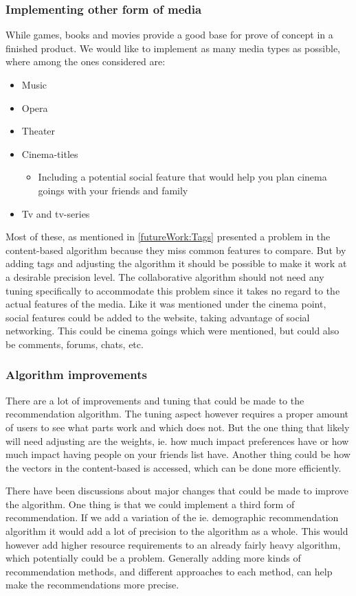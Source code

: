 \subsubsection{Implementing other form of media}
While games, books and movies provide a good base for prove of concept in a finished product. We would like to implement as many media types as possible, where among the ones considered are:
\begin{itemize}
\item Music
\item Opera
\item Theater
\item Cinema-titles
\begin{itemize}
\item Including a potential social feature that would help you plan cinema goings with your friends and family
\end{itemize}
\item Tv and tv-series
\end{itemize}
Most of these, as mentioned in \ref{futureWork:Tags} presented a problem in the content-based algorithm because they miss common features to compare. But by adding tags and adjusting the algorithm it should be possible to make it work at a desirable precision level. The collaborative algorithm should not need any tuning specifically to accommodate this problem since it takes no regard to the actual features of the media. Like it was mentioned under the cinema point, social features could be added to the website, taking advantage of social networking. This could be cinema goings which were mentioned, but could also be comments, forums, chats, etc.

\subsubsection{Algorithm improvements}
There are a lot of improvements and tuning that could be made to the recommendation algorithm. The tuning aspect however requires a proper amount of users to see what parts work and which does not. But the one thing that likely will need adjusting are the weights, ie. how much impact preferences have or how much impact having people on your friends list have. Another thing could be how the vectors in the content-based is accessed, which can be done more efficiently.

There have been discussions about major changes that could be made to improve the algorithm. One thing is that we could implement a third form of recommendation. If we add a variation of the ie. demographic recommendation algorithm it would add a lot of precision to the algorithm as a whole. This would however add higher resource requirements to an already fairly heavy algorithm, which potentially could be a problem. Generally adding more kinds of recommendation methods, and different approaches to each method, can help make the recommendations more precise.

